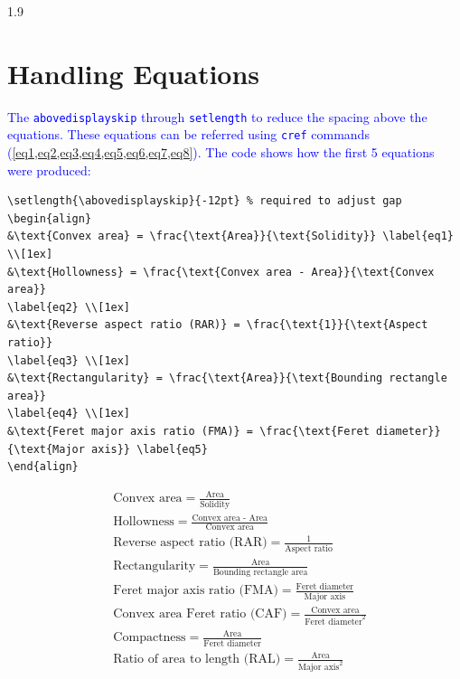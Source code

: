 \documentclass[phd]{ndsu-thesis-2022}
\newcommand\myspacing{1.9} %
\newcommand\italk[1]{\textcolor{blue}{#1}}  %
\begin{document}
\begin{spacing}{\myspacing}
\section{Handling Equations}
\italk{The \texttt{abovedisplayskip} through \texttt{setlength} to reduce the spacing above the equations. These equations can be referred using \texttt{cref} commands (\cref{eq1,eq2,eq3,eq4,eq5,eq6,eq7,eq8}). The code shows how the first 5 equations were produced:}

\vspace{1ex}
{\singlespacing
\begin{verbatim}
\setlength{\abovedisplayskip}{-12pt} % required to adjust gap 
\begin{align}
&\text{Convex area} = \frac{\text{Area}}{\text{Solidity}} \label{eq1} \\[1ex]
&\text{Hollowness} = \frac{\text{Convex area - Area}}{\text{Convex area}} 
\label{eq2} \\[1ex]
&\text{Reverse aspect ratio (RAR)} = \frac{\text{1}}{\text{Aspect ratio}} 
\label{eq3} \\[1ex]
&\text{Rectangularity} = \frac{\text{Area}}{\text{Bounding rectangle area}}
\label{eq4} \\[1ex]
&\text{Feret major axis ratio (FMA)} = \frac{\text{Feret diameter}}
{\text{Major axis}} \label{eq5} 
\end{align}
\end{verbatim}
}

\setlength{\abovedisplayskip}{-12pt} %
\begin{align}
&\text{Convex area} = \frac{\text{Area}}{\text{Solidity}} \label{eq1} \\[1ex]
&\text{Hollowness} = \frac{\text{Convex area - Area}}{\text{Convex area}} \label{eq2} \\[1ex]
&\text{Reverse aspect ratio (RAR)} = \frac{\text{1}}{\text{Aspect ratio}} \label{eq3} \\[1ex]
&\text{Rectangularity} = \frac{\text{Area}}{\text{Bounding rectangle area}} \label{eq4} \\[1ex]
&\text{Feret major axis ratio (FMA)} = \frac{\text{Feret diameter}}{\text{Major axis}} \label{eq5} \\[1ex]
&\text{Convex area Feret ratio (CAF)} = \frac{\text{Convex area}}{\text{Feret diameter}^2} \label{eq6}\\[1ex]
&\text{Compactness} = \frac{\text{Area}}{\text{Feret diameter}} \label{eq7}\\[1ex]
&\text{Ratio of area to length (RAL)} = \frac{\text{Area}}{\text{Major axis}^2} \label{eq8}
\end{align}


\end{spacing}
\end{document}
